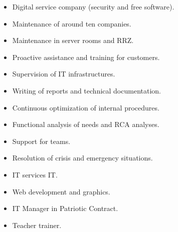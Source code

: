 \documentclass[10pt,a4paper,ragged2e,withhyper,normalphoto]{altacv}
\begin{document}
\begin{paracol}{2}


\begin{itemize}
\item Digital service company (security and free software).
\item Maintenance of around ten companies.
\item Maintenance in server rooms and RRZ.
\item Proactive assistance and training for customers.
\item Supervision of IT infrastructures.
\item Writing of reports and technical documentation.
\item Continuous optimization of internal procedures.
\item Functional analysis of needs and RCA analyses.
\item Support for teams.
\item Resolution of crisis and emergency situations.
\end{itemize}

\divider

\begin{itemize}
\item IT services IT.
\item Web development and graphics.
\end{itemize}

\divider

\begin{itemize}
 \item IT Manager in Patriotic Contract.
\end{itemize}

\divider

\switchcolumn

\bigskip \bigskip \bigskip \bigskip

\begin{itemize}
\item Teacher trainer.
\end{itemize}

\divider




\end{paracol}
\end{document}
